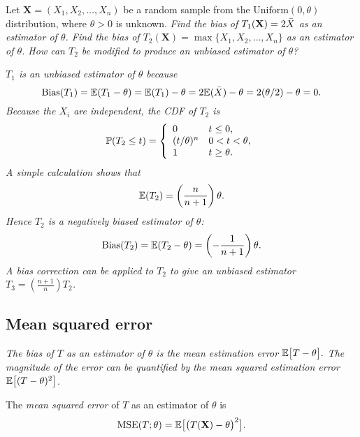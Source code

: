 \begin{exercise}
Let $\mathbf{X}=(X_1,X_2,\ldots,X_n)$ be a random sample from the $\text{Uniform}(0,\theta)$ distribution, where $\theta>0$ is unknown. 
\ben
\it Find the bias of $T_1(\mathbf{X}) = 2\bar{X}$ as an estimator of $\theta$.
\it Find the bias of $T_2(\mathbf{X}) = \max\{X_1,X_2,\ldots,X_n\}$ as an estimator of $\theta$.
\it How can $T_2$ be modified to produce an unbiased estimator of $\theta$?
\een
\begin{answer}
\ben
\it %
$T_1$ is an \emph{unbiased} estimator of $\theta$ because
\[
\text{Bias}(T_1)
	= \mathbb{E}(T_1 - \theta)
	= \mathbb{E}(T_1) - \theta
	= 2\mathbb{E}(\bar{X}) -\theta
	= 2(\theta/2) - \theta
	= 0.
\]
\it %
Because the $X_i$ are independent, the CDF of $T_2$ is
\[
\mathbb{P}(T_2 \leq t) = \left\{\begin{array}{ll}
	0				& t \leq 0, \\
	(t/\theta)^n 	& 0 < t < \theta, \\
	1				& t \geq \theta.
\end{array}\right.
\]
A simple calculation shows that 
\[
\displaystyle\mathbb{E}(T_2) = \left(\frac{n}{n+1}\right)\theta.
\]
Hence $T_2$ is a \emph{negatively biased} estimator of $\theta$:
\[
\text{Bias}(T_2) = \mathbb{E}(T_2 - \theta) = \left(-\frac{1}{n+1}\right)\theta.
\]
\it %
A \emph{bias correction} can be applied to $T_2$ to give an unbiased estimator $T_3 = \displaystyle\left(\frac{n+1}{n}\right)T_2$.
\een
\end{answer}
\end{exercise}
\subsection{Mean squared error}
\bit
\it The bias of $T$ as an estimator of $\theta$ is the \emph{mean estimation error} $\mathbb{E}\big[T-\theta\big].$ 
\it The magnitude of the error can be quantified by the \emph{mean squared estimation error} $\mathbb{E}\big[(T-\theta)^2\big]$.
\eit

\begin{definition}
The \emph{mean squared error} of $T$ as an estimator of $\theta$ is
\[
\text{MSE}(T;\theta) = \mathbb{E}\big[\big(T(\mathbf{X})-\theta\big)^2\big].
\]
\end{definition}


